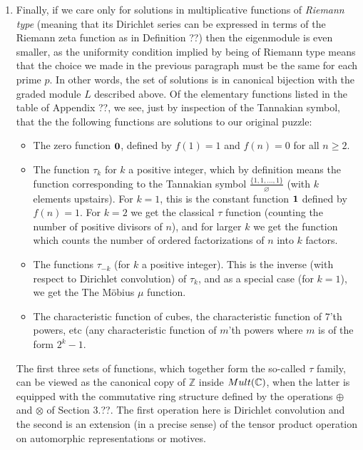 \begin{example}
\begin{enumerate}
\item Finally, if we care only for solutions in multiplicative functions of \emph{Riemann type} (meaning that its Dirichlet series can be expressed in terms of the Riemann zeta function as in Definition ??) then the eigenmodule is even smaller, as the uniformity condition implied by being of Riemann type means that the choice we made in the previous paragraph must be the same for each prime $p$. In other words, the set of solutions is in canonical bijection with the graded module $L$ described above. Of the elementary functions listed in the table of Appendix ??, we see, just by inspection of the Tannakian symbol, that the the following functions are solutions to our original puzzle:
\begin{itemize}
\item The zero function $\mathbf{0}$, defined by $f(1) = 1$ and $f(n) = 0$ for all $n \geq 2$. 
\item The function $\tau_k$ for $k$ a positive integer, which by definition means the function corresponding to the Tannakian symbol $\frac{ \{1, 1, \ldots, 1 \} }{ \varnothing  }$ (with $k$ elements upstairs). For $k=1$, this is the constant function $\mathbf{1}$ defined by $f(n) = 1$. For $k = 2$ we get the classical $\tau$ function (counting the number of positive divisors of $n$), and for larger $k$ we get the function which counts the number of ordered factorizations of $n$ into $k$ factors.
\item The functions $\tau_{-k}$ (for $k$ a positive integer). This is the inverse (with respect to Dirichlet convolution) of $\tau_k$, and as a special case (for $k=1$), we get the The M{\"o}bius $\mu$ function.
\item The characteristic function of cubes, the characteristic function of $7$'th powers, etc (any characteristic function of $m$'th powers where $m$ is of the form $2^k-1$. 
\end{itemize}

The first three sets of functions, which together form the so-called $\tau$ family, can be viewed as the canonical copy of $\mathbb{Z}$ inside $Mult(\mathbb{C})$, when the latter is equipped with the commutative ring structure defined by the operations $\oplus$ and $\otimes$ of Section 3.??. The first operation here is Dirichlet convolution and the second is an extension (in a precise sense) of the tensor product operation on automorphic representations or motives.



\end{enumerate}


\end{example}



